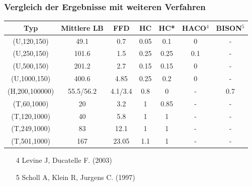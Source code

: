 \documentclass{beamer}
\begin{document}
\begin{frame}
\frametitle{Vergleich der Ergebnisse mit weiteren Verfahren}

\begin{scriptsize}
\begin{table}
\begin{tabular}{c c c c c c c }
\toprule
\textbf{Typ} &   \textbf{Mittlere LB} & \textbf{FFD} & \textbf{HC} & \textbf{HC*}  & \textbf{HACO$^4$} & \textbf{BISON$^5$}\\
\midrule
(U,120,150) & 49.1  & 0.7 & 0.05 & 0.1 & 0 & -\\
(U,250,150) & 101.6  & 1.5 & 0.25 & 0.25 & 0.1 & -\\
(U,500,150)  & 201.2  & 2.7 & 0.15 & 0.15 &  0 & -\\
(U,1000,150)  & 400.6  & 4.85 & 0.25 & 0.2 & 0 & -\\ \midrule
(H,200,100000)  & 55.5/56.2  & 4.1/3.4 & 0.8 & 0 & - & 0.7 \\\midrule
(T,60,1000)     & 20 & 3.2 & 1 & 0.85 & - & - \\
(T,120,1000)    & 40  & 5.8 & 1 &1 & - & - \\
(T,249,1000)      & 83  & 12.1 & 1 & 1 & - & -\\
(T,501,1000)      & 167  & 23.05 & 1.1 & 1 & - & - \\
\bottomrule
\end{tabular}
\end{table}
\end{scriptsize}
\begin{scriptsize}
\begin{itemize}
\item[4] Levine J, Ducatelle F. (2003)
\item[5] Scholl A, Klein R, Jurgens C. (1997)
\end{itemize}
\end{scriptsize}

\end{frame}
\end{document}
